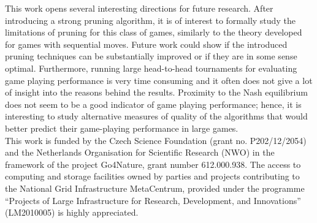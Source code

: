 This work opens several interesting directions for future research. After introducing a strong pruning algorithm, it is of interest to formally study the limitations of pruning  for this class of games, similarly to the theory developed for games with sequential moves. Future work could show if the introduced pruning techniques can be substantially improved or if they are in some sense optimal.
Furthermore, running large head-to-head tournaments for evaluating game playing performance is very time consuming and it often does not give a lot of insight into the reasons behind the results. Proximity to the Nash equilibrium does not seem to be a good indicator of game playing performance; hence, it is interesting to study alternative measures of quality of the algorithms that would better predict their game-playing performance in large games. \\

 This work is funded by the Czech Science Foundation (grant no. P202/12/2054) and the Netherlands
Organisation for Scientific Research (NWO) in the framework of the project Go4Nature, grant number 612.000.938. 
The access to computing and storage facilities owned by parties and projects contributing to the National Grid 
Infrastructure MetaCentrum, provided under the 
programme ``Projects of Large Infrastructure for Research, Development, and Innovations'' (LM2010005) is highly appreciated.

